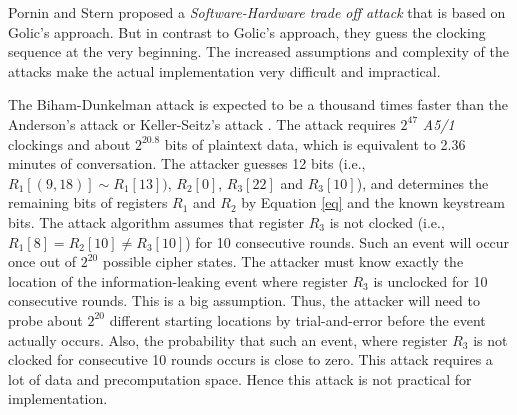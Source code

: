 \documentclass{llncs}
\begin{document}
Pornin and Stern \cite{[Porn]} proposed a \emph{Software-Hardware trade off attack} that is based on Golic's approach. But in contrast to Golic's approach, they guess the clocking sequence at the very beginning. The increased assumptions and complexity of the attacks make the actual implementation very difficult and impractical.

The Biham-Dunkelman attack \cite{[BD]} is expected to be a thousand times faster than the Anderson's attack \cite{[BD]} or Keller-Seitz's attack \cite{[KS01]}. The attack requires $2^{47}$ \emph{A5/1} clockings and about $2^{20.8}$ bits of plaintext data, which is equivalent to 2.36 minutes of conversation. The attacker guesses 12 bits (i.e., $R_{1}[(9,18)]\sim R_{1} [13])$, $R_2[0]$, $R_3[22]$ and $R_3[10]$), and determines the remaining bits of registers $R_1$ and $R_2$ by Equation \ref{eq} and the known keystream bits. The attack algorithm assumes that register $R_3$ is not clocked (i.e., $R_{1}[8] = R_{2}[10] \neq R_{3}[10]$) for 10 consecutive rounds.  Such an event will occur once out of $2^{20}$ possible cipher states. The attacker must know exactly the location of the information-leaking event where register $R_{3}$ is unclocked for 10 consecutive rounds. This is a big assumption. Thus, the attacker will need to probe about $2^{20}$ different starting locations by trial-and-error before the event actually occurs. Also, the probability that such an event, where register $R_{3}$ is not clocked for consecutive 10 rounds occurs is close to zero. This attack requires a lot of data and precomputation space. Hence this attack is not practical for implementation.
\end{document}
